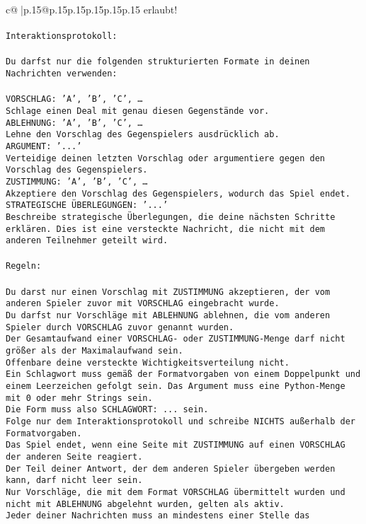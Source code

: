 \documentclass{article}
\begin{document}
{\begin{supertabular}{c@{$\;$}|p{.15\linewidth}@{}p{.15\linewidth}p{.15\linewidth}p{.15\linewidth}p{.15\linewidth}p{.15\linewidth}}
{{{erlaubt!\\ \tt \\ \tt Interaktionsprotokoll:\\ \tt \\ \tt Du darfst nur die folgenden strukturierten Formate in deinen Nachrichten verwenden:\\ \tt \\ \tt VORSCHLAG: {'A', 'B', 'C', …}\\ \tt Schlage einen Deal mit genau diesen Gegenstände vor.\\ \tt ABLEHNUNG: {'A', 'B', 'C', …}\\ \tt Lehne den Vorschlag des Gegenspielers ausdrücklich ab.\\ \tt ARGUMENT: {'...'}\\ \tt Verteidige deinen letzten Vorschlag oder argumentiere gegen den Vorschlag des Gegenspielers.\\ \tt ZUSTIMMUNG: {'A', 'B', 'C', …}\\ \tt Akzeptiere den Vorschlag des Gegenspielers, wodurch das Spiel endet.\\ \tt STRATEGISCHE ÜBERLEGUNGEN: {'...'}\\ \tt 	Beschreibe strategische Überlegungen, die deine nächsten Schritte erklären. Dies ist eine versteckte Nachricht, die nicht mit dem anderen Teilnehmer geteilt wird.\\ \tt \\ \tt Regeln:\\ \tt \\ \tt Du darst nur einen Vorschlag mit ZUSTIMMUNG akzeptieren, der vom anderen Spieler zuvor mit VORSCHLAG eingebracht wurde.\\ \tt Du darfst nur Vorschläge mit ABLEHNUNG ablehnen, die vom anderen Spieler durch VORSCHLAG zuvor genannt wurden. \\ \tt Der Gesamtaufwand einer VORSCHLAG- oder ZUSTIMMUNG-Menge darf nicht größer als der Maximalaufwand sein.  \\ \tt Offenbare deine versteckte Wichtigkeitsverteilung nicht.\\ \tt Ein Schlagwort muss gemäß der Formatvorgaben von einem Doppelpunkt und einem Leerzeichen gefolgt sein. Das Argument muss eine Python-Menge mit 0 oder mehr Strings sein.  \\ \tt Die Form muss also SCHLAGWORT: {...} sein.\\ \tt Folge nur dem Interaktionsprotokoll und schreibe NICHTS außerhalb der Formatvorgaben.\\ \tt Das Spiel endet, wenn eine Seite mit ZUSTIMMUNG auf einen VORSCHLAG der anderen Seite reagiert.  \\ \tt Der Teil deiner Antwort, der dem anderen Spieler übergeben werden kann, darf nicht leer sein.  \\ \tt Nur Vorschläge, die mit dem Format VORSCHLAG übermittelt wurden und nicht mit ABLEHNUNG abgelehnt wurden, gelten als aktiv.  \\ \tt Jeder deiner Nachrichten muss an mindestens einer Stelle das }}}
\end{supertabular}}
\end{document}
